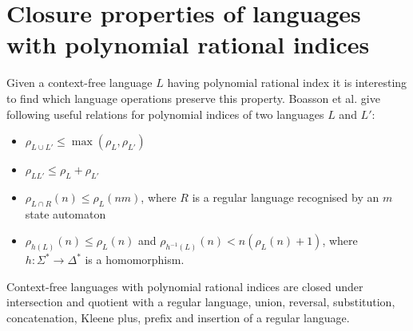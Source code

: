 \section{Closure properties of languages with polynomial rational indices}
\label{sec:closure}
Given a context-free language $L$ having polynomial rational index it is interesting to find which language operations preserve this property.  Boasson et al. \cite{RatBasic} give following useful relations for polynomial indices of two languages $L$ and $L'$:
\begin{itemize}
\item $\rho_{L \cup L'} \le  \max{(\rho_L, \rho_{L'})} $
\item $\rho_{LL'} \le \rho_L + \rho_{L'}$
\item $\rho_{L \cap R}(n) \le \rho_L(nm)$, where $R$ is a regular language recognised by an $m$ state automaton
\item $\rho_{h(L)}(n) \le \rho_L(n)$ and $\rho_{h^{-1}(L)}(n) < n(\rho_L(n) +1)$, where $h: \Sigma^* \rightarrow \Delta^*$ is a homomorphism.
\end{itemize}
\begin{theorem}
Context-free languages with polynomial rational indices are closed under intersection and quotient with a regular language, union, reversal, substitution, concatenation, Kleene plus, prefix and  insertion of a regular language.
\end{theorem}
